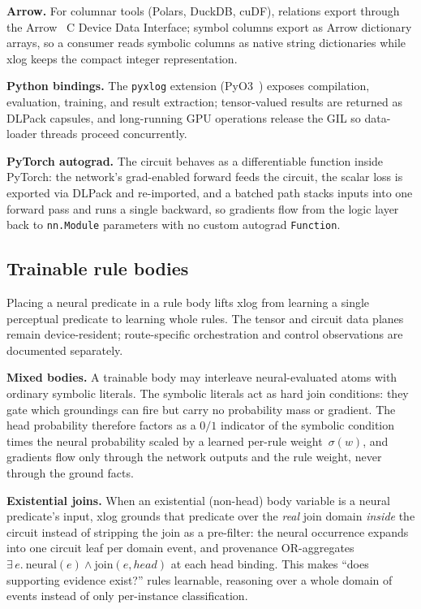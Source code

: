 \textbf{Arrow.} For columnar tools (Polars, DuckDB, cuDF), relations export through the Arrow~\cite{arrow} C Device Data Interface; symbol columns export as Arrow dictionary arrays, so a consumer reads symbolic columns as native string dictionaries while xlog keeps the compact integer representation.

\textbf{Python bindings.} The \texttt{pyxlog} extension (PyO3~\cite{pyo3}) exposes compilation, evaluation, training, and result extraction; tensor-valued results are returned as DLPack capsules, and long-running GPU operations release the GIL so data-loader threads proceed concurrently.

\textbf{PyTorch autograd.} The circuit behaves as a differentiable function inside PyTorch: the network's grad-enabled forward feeds the circuit, the scalar loss is exported via DLPack and re-imported, and a batched path stacks inputs into one forward pass and runs a single backward, so gradients flow from the logic layer back to \texttt{nn.Module} parameters with no custom autograd \texttt{Function}.

\subsection{Trainable rule bodies}\label{subsec:trainable-bodies}

Placing a neural predicate in a rule body lifts xlog from learning a single perceptual predicate to learning whole rules. The tensor and circuit data planes remain device-resident; route-specific orchestration and control observations are documented separately.

\textbf{Mixed bodies.} A trainable body may interleave neural-evaluated atoms with ordinary symbolic literals. The symbolic literals act as hard join conditions: they gate which groundings can fire but carry no probability mass or gradient. The head probability therefore factors as a $0/1$ indicator of the symbolic condition times the neural probability scaled by a learned per-rule weight~$\sigma(w)$, and gradients flow only through the network outputs and the rule weight, never through the ground facts.

\textbf{Existential joins.} When an existential (non-head) body variable is a neural predicate's input, xlog grounds that predicate over the \emph{real} join domain \emph{inside} the circuit instead of stripping the join as a pre-filter: the neural occurrence expands into one circuit leaf per domain event, and provenance OR-aggregates $\exists\,e.\ \mathrm{neural}(e)\wedge\mathrm{join}(e,\mathit{head})$ at each head binding. This makes ``does supporting evidence exist?'' rules learnable, reasoning over a whole domain of events instead of only per-instance classification.

